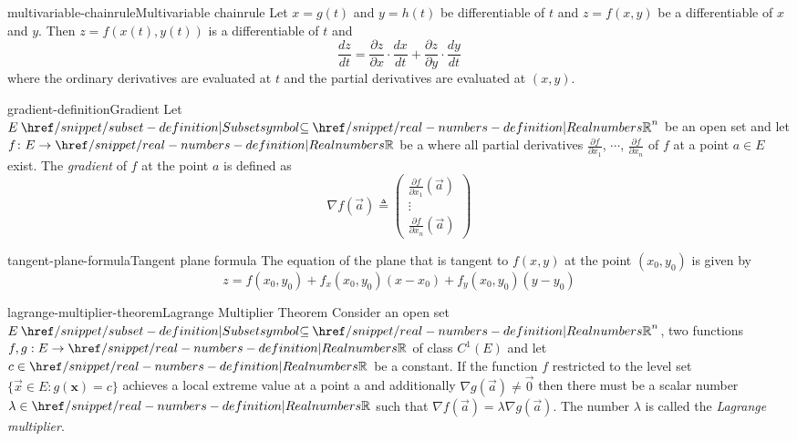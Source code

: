 \documentclass[preview]{standalone}
\begin{document}
\genpage

\begin{snippettheorem}{multivariable-chainrule}{Multivariable chainrule}
    Let \(x=g(t)\) and \(y=h(t)\) be differentiable \function[functions] of \(t\)
    and \(z=f(x,y)\) be a differentiable \function of \(x\) and \(y\).
    Then \(z=f(x(t), y(t))\) is a differentiable \function of \(t\) and
    \[
        \frac{dz}{dt} =
        \frac{\partial z}{\partial x} \cdot \frac{dx}{dt} +
        \frac{\partial z}{\partial y} \cdot \frac{dy}{dt}
    \]
    where the ordinary derivatives are evaluated at \(t\) and the partial
    derivatives are evaluated at \((x,y)\).
\end{snippettheorem}

\begin{snippetdefinition}{gradient-definition}{Gradient}
    Let \(E \subseteq {\realnumbers}^n\) be an open set and
    let \(f\colon E \to \realnumbers\) be a \function where
    all partial derivatives \(\frac{\partial f}{\partial x_1}\),
    \(\cdots\), \(\frac{\partial f}{\partial x_n}\) of \(f\)
    at a point \(a\in E\) exist.
    The \textit{gradient} of \(f\) at the point \(a\)
    is defined as
    \[
        \nabla f(\vec{a}) \triangleq
        \left(\begin{array}{c}
        \frac{\partial f}{\partial x_1}(\vec{a}) \\
        \vdots \\
        \frac{\partial f}{\partial x_n}(\vec{a})
        \end{array}\right)
    \]
\end{snippetdefinition}

\begin{snippetproposition}{tangent-plane-formula}{Tangent plane formula}
    The equation of the plane that is tangent to \(f(x,y)\)
    at the point \((x_0, y_0)\) is given by
    \[
        z = f(x_0, y_0) + f_x(x_0, y_0)(x-x_0) + f_y(x_0, y_0)(y-y_0)
    \]
\end{snippetproposition}



\begin{snippettheorem}{lagrange-multiplier-theorem}{Lagrange Multiplier Theorem}
    Consider an open set $E \subseteq {\realnumbers}^n$, two functions $f, g: E \rightarrow \realnumbers$
    of class $C^1(E)$ and let $c \in \realnumbers$ be a constant.
    If the function $f$ restricted to the level set $\{\vec{x} \in E: g(\mathbf{x})=c\}$
    achieves a local extreme value at a point a and additionally
    $\nabla g(\vec{a}) \neq \vec{0}$ then there must be a scalar
    number $\lambda \in \realnumbers$ such that
    $\nabla f(\vec{a})=\lambda \nabla g(\vec{a})$. 
    The number $\lambda$ is called the \textit{Lagrange multiplier}.
\end{snippettheorem}


\end{document}
